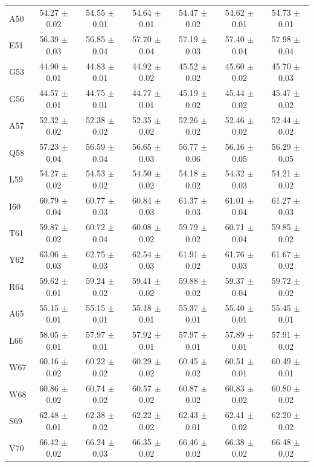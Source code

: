 \documentclass[%
 aip,
 amsmath,amssymb,
 preprint,%
]{revtex4-1}
\begin{document}
\begin{center}
\begin{longtable}{l|c|c|c|c|c|c}
A50 & 54.27 $\pm$ 0.02 & 54.55 $\pm$ 0.01 & 54.64 $\pm$ 0.01 & 54.47 $\pm$ 0.02 & 54.62 $\pm$ 0.01 & 54.73 $\pm$ 0.01 \\
E51 & 56.39 $\pm$ 0.03 & 56.85 $\pm$ 0.04 & 57.70 $\pm$ 0.04 & 57.19 $\pm$ 0.03 & 57.40 $\pm$ 0.04 & 57.98 $\pm$ 0.04 \\
G53 & 44.90 $\pm$ 0.01 & 44.83 $\pm$ 0.01 & 44.92 $\pm$ 0.02 & 45.52 $\pm$ 0.02 & 45.60 $\pm$ 0.02 & 45.70 $\pm$ 0.03 \\
G56 & 44.57 $\pm$ 0.01 & 44.75 $\pm$ 0.01 & 44.77 $\pm$ 0.01 & 45.19 $\pm$ 0.02 & 45.44 $\pm$ 0.02 & 45.47 $\pm$ 0.02 \\
A57 & 52.32 $\pm$ 0.02 & 52.38 $\pm$ 0.02 & 52.35 $\pm$ 0.02 & 52.26 $\pm$ 0.02 & 52.46 $\pm$ 0.02 & 52.44 $\pm$ 0.02 \\
Q58 & 57.23 $\pm$ 0.04 & 56.59 $\pm$ 0.04 & 56.65 $\pm$ 0.03 & 56.77 $\pm$ 0.06 & 56.16 $\pm$ 0.05 & 56.29 $\pm$ 0.05 \\
L59 & 54.27 $\pm$ 0.02 & 54.53 $\pm$ 0.02 & 54.50 $\pm$ 0.02 & 54.18 $\pm$ 0.02 & 54.32 $\pm$ 0.03 & 54.21 $\pm$ 0.02 \\
I60 & 60.79 $\pm$ 0.04 & 60.77 $\pm$ 0.03 & 60.84 $\pm$ 0.03 & 61.37 $\pm$ 0.03 & 61.01 $\pm$ 0.04 & 61.27 $\pm$ 0.03 \\
T61 & 59.87 $\pm$ 0.02 & 60.72 $\pm$ 0.04 & 60.08 $\pm$ 0.02 & 59.79 $\pm$ 0.02 & 60.71 $\pm$ 0.04 & 59.85 $\pm$ 0.02 \\
Y62 & 63.06 $\pm$ 0.03 & 62.75 $\pm$ 0.03 & 62.54 $\pm$ 0.03 & 61.91 $\pm$ 0.02 & 61.76 $\pm$ 0.03 & 61.67 $\pm$ 0.02 \\
R64 & 59.62 $\pm$ 0.01 & 59.24 $\pm$ 0.02 & 59.41 $\pm$ 0.02 & 59.88 $\pm$ 0.02 & 59.37 $\pm$ 0.04 & 59.72 $\pm$ 0.02 \\
A65 & 55.15 $\pm$ 0.01 & 55.15 $\pm$ 0.01 & 55.18 $\pm$ 0.01 & 55.37 $\pm$ 0.01 & 55.40 $\pm$ 0.01 & 55.45 $\pm$ 0.01 \\
L66 & 58.05 $\pm$ 0.01 & 57.97 $\pm$ 0.01 & 57.92 $\pm$ 0.01 & 57.97 $\pm$ 0.01 & 57.89 $\pm$ 0.01 & 57.91 $\pm$ 0.02 \\
W67 & 60.16 $\pm$ 0.02 & 60.22 $\pm$ 0.02 & 60.29 $\pm$ 0.02 & 60.45 $\pm$ 0.02 & 60.51 $\pm$ 0.01 & 60.49 $\pm$ 0.01 \\
W68 & 60.86 $\pm$ 0.02 & 60.74 $\pm$ 0.02 & 60.57 $\pm$ 0.02 & 60.87 $\pm$ 0.02 & 60.83 $\pm$ 0.02 & 60.80 $\pm$ 0.02 \\
S69 & 62.48 $\pm$ 0.01 & 62.38 $\pm$ 0.02 & 62.22 $\pm$ 0.02 & 62.43 $\pm$ 0.01 & 62.41 $\pm$ 0.02 & 62.20 $\pm$ 0.02 \\
V70 & 66.42 $\pm$ 0.02 & 66.24 $\pm$ 0.03 & 66.35 $\pm$ 0.02 & 66.46 $\pm$ 0.02 & 66.38 $\pm$ 0.02 & 66.48 $\pm$ 0.02 \\

\end{longtable}
\end{center}
\end{document}

